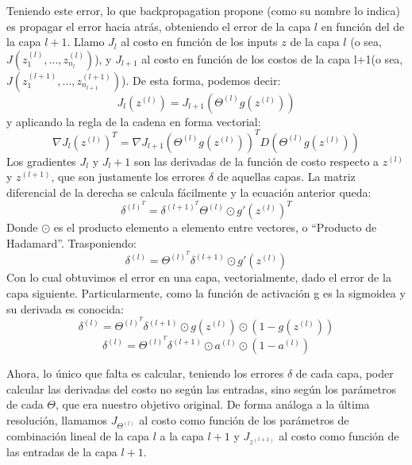 Teniendo este error, lo que backpropagation propone (como su nombre lo indica) es propagar el error hacia atrás, obteniendo el error de la capa $l$ en función del de la capa $l+1$. Llamo $J_l$ al costo en función de los inputs $z$ de la capa $l$ (o sea, $J(z_1^{(l)}, ... , z_{n_l}^{(l)})$), y $J_{l+1}$ al costo en función de los costos de la capa l+1(o sea, $J(z_1^{(l+1)}, ... , z_{n_{l+1}}^{(l+1)})$). De esta forma, podemos decir:
\begin{equation}
J_l(z^{(l)}) = J_{l+1}(\Theta^{(l)} g(z^{(l)})) 
\end{equation}
y aplicando la regla de la cadena en forma vectorial:
\begin{equation}
\nabla J_l(z^{(l)})^T = \nabla J_{l+1}(\Theta^{(l)} g(z^{(l)}))^T D(\Theta^{(l)} g(z^{(l)}))
\end{equation}
Los gradientes $J_l$ y $J_l+1$ son las derivadas de la función de costo respecto a $z^{(l)}$ y $z^{(l+1)}$, que son justamente los errores $\delta$ de aquellas capas. La matriz diferencial de la derecha se calcula fácilmente y la ecuación anterior queda:
\begin{equation}
\delta^{(l)^T} = \delta^{(l+1)^T} \Theta^{(l)} \odot g'(z^{(l)})^T
\end{equation}
Donde $\odot$ es el producto elemento a elemento entre vectores, o ``Producto de Hadamard''. Trasponiendo:
\begin{equation}
\delta^{(l)} = \Theta^{(l)^T} \delta^{(l+1)} \odot g'(z^{(l)})
\end{equation}
Con lo cual obtuvimos el error en una capa, vectorialmente, dado el error de la capa siguiente. Particularmente, como la función de activación g es la sigmoidea y su derivada es conocida:
\begin{equation}
\delta^{(l)} = \Theta^{(l)^T} \delta^{(l+1)} \odot g(z^{(l)}) \odot (1-g(z^{(l)}))
\end{equation}
\begin{equation} \label{eq:error}
\delta^{(l)} = \Theta^{(l)^T} \delta^{(l+1)} \odot a^{(l)} \odot (1-a^{(l)})
\end{equation}

Ahora, lo único que falta es calcular, teniendo los errores $\delta$ de cada capa, poder calcular las derivadas del costo no según las entradas, sino según los parámetros de cada $\Theta$, que era nuestro objetivo original. De forma análoga a la última resolución, llamamos $J_{\Theta^{(l)}}$ al costo como función de los parámetros de combinación lineal de la capa $l$ a la capa $l+1$ y $J_{z^{(l+1)}}$ al costo como función de las entradas de la capa $l+1$.

